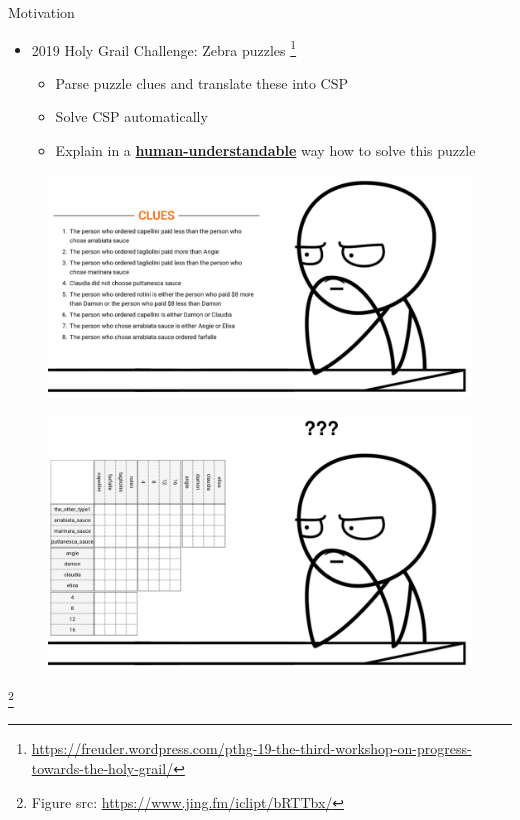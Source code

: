 \documentclass{beamer}
\begin{document}
\begin{frame}{Motivation}
    \begin{itemize}
        \item 2019 Holy Grail Challenge: Zebra puzzles \footnote{\tiny\url{https://freuder.wordpress.com/pthg-19-the-third-workshop-on-progress-towards-the-holy-grail/}}
              \begin{itemize}
                  \item Parse puzzle clues and translate these into CSP\pause
                  \item Solve CSP automatically\pause
                  \item Explain in a \textbf{\underline{human-understandable}} way how to solve this puzzle
              \end{itemize}
    \end{itemize}
    \begin{minipage}[t]{0.48\linewidth}
        \centering
        \vspace{0.46cm}
        \begin{figure}[h]
            \includegraphics[width=\textwidth]{figures/meme_clues}
            \label{clues}
        \end{figure}
    \end{minipage}\hfill
    \begin{minipage}[t]{0.48\linewidth}
        \centering
        \begin{figure}[h]
            \includegraphics[width=\textwidth]{figures/meme}
            \label{grid}
        \end{figure}

    \end{minipage}
    \footnote{\tiny Figure src: \url{https://www.jing.fm/iclipt/bRTTbx/}}
\end{frame}
\end{document}
